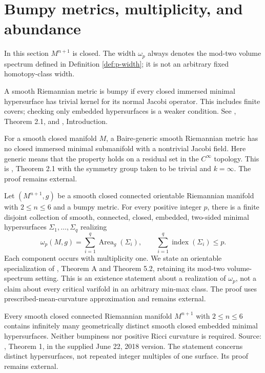 \chapter{Bumpy metrics, multiplicity, and abundance}\label{sec:bumpy-multiplicity-abundance}
In this section $M^{n+1}$ is closed. The width $\omega_p$ always denotes the mod-two volume spectrum defined in Definition \ref{def:p-width}; it is not an arbitrary fixed homotopy-class width.

\begin{definition}\label{def:bumpy-metric}
A smooth Riemannian metric is bumpy if every closed immersed minimal hypersurface has trivial kernel for its normal Jacobi operator. This includes finite covers; checking only embedded hypersurfaces is a weaker condition. See \cite{White17}, Theorem 2.1, and \cite{Zhou20}, Introduction.
\end{definition}

\begin{theorem}\label{thm:bumpy-metrics}
For a smooth closed manifold $M$, a Baire-generic smooth Riemannian metric has no closed immersed minimal submanifold with a nontrivial Jacobi field. Here generic means that the property holds on a residual set in the $C^\infty$ topology. This is \cite{White17}, Theorem 2.1 with the symmetry group taken to be trivial and $k=\infty$. The proof remains external.
\end{theorem}

\begin{theorem}\label{thm:zhou-multiplicity-one}
Let $(M^{n+1},g)$ be a smooth closed connected orientable Riemannian manifold with $2\leq n\leq6$ and a bumpy metric. For every positive integer $p$, there is a finite disjoint collection of smooth, connected, closed, embedded, two-sided minimal hypersurfaces $\Sigma_1,\ldots,\Sigma_q$ realizing
\[
 \omega_p(M,g)=\sum_{i=1}^q\operatorname{Area}_g(\Sigma_i),\qquad
 \sum_{i=1}^q\operatorname{index}(\Sigma_i)\leq p.
\]
Each component occurs with multiplicity one. We state an orientable specialization of \cite{Zhou20}, Theorem A and Theorem 5.2, retaining its mod-two volume-spectrum setting. This is an existence statement about a realization of $\omega_p$, not a claim about every critical varifold in an arbitrary min-max class. The proof uses prescribed-mean-curvature approximation and remains external.
\end{theorem}

\begin{theorem}\label{thm:song-infinitely-many}
Every smooth closed connected Riemannian manifold $M^{n+1}$ with $2\leq n\leq6$ contains infinitely many geometrically distinct smooth closed embedded minimal hypersurfaces. Neither bumpiness nor positive Ricci curvature is required. Source: \cite{Song18}, Theorem 1, in the supplied June 22, 2018 version. The statement concerns distinct hypersurfaces, not repeated integer multiples of one surface. Its proof remains external.
\end{theorem}

